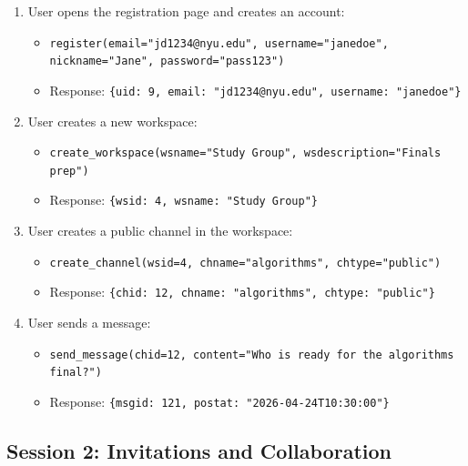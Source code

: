 \documentclass[11pt]{article}
\begin{document}
\begin{enumerate}
    \item User opens the registration page and creates an account:
    \begin{itemize}
        \item \texttt{register(email="jd1234@nyu.edu", username="janedoe", nickname="Jane", password="pass123")}
        \item Response: \texttt{\{uid: 9, email: "jd1234@nyu.edu", username: "janedoe"\}}
    \end{itemize}

    \item User creates a new workspace:
    \begin{itemize}
        \item \texttt{create\_workspace(wsname="Study Group", wsdescription="Finals prep")}
        \item Response: \texttt{\{wsid: 4, wsname: "Study Group"\}}
    \end{itemize}

    \item User creates a public channel in the workspace:
    \begin{itemize}
        \item \texttt{create\_channel(wsid=4, chname="algorithms", chtype="public")}
        \item Response: \texttt{\{chid: 12, chname: "algorithms", chtype: "public"\}}
    \end{itemize}

    \item User sends a message:
    \begin{itemize}
        \item \texttt{send\_message(chid=12, content="Who is ready for the algorithms final?")}
        \item Response: \texttt{\{msgid: 121, postat: "2026-04-24T10:30:00"\}}
    \end{itemize}
\end{enumerate}

\subsection{Session 2: Invitations and Collaboration}
\end{document}
